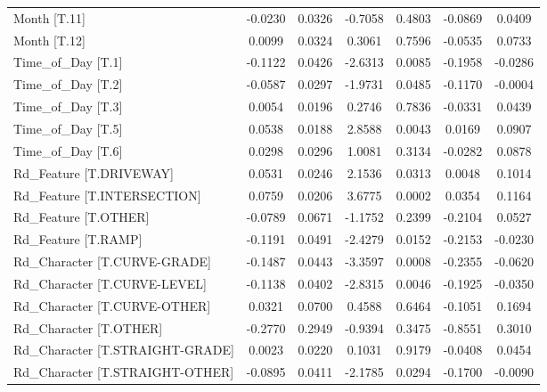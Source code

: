 \begin{longtable}{p{4cm}cccccc}
Month [T.11]                                  & -0.0230 &    0.0326 & -0.7058 &       0.4803 & -0.0869 &  0.0409 \\
Month [T.12]                                  &  0.0099 &    0.0324 &  0.3061 &       0.7596 & -0.0535 &  0.0733 \\
Time\_of\_Day [T.1]                             & -0.1122 &    0.0426 & -2.6313 &       0.0085 & -0.1958 & -0.0286 \\
Time\_of\_Day [T.2]                             & -0.0587 &    0.0297 & -1.9731 &       0.0485 & -0.1170 & -0.0004 \\
Time\_of\_Day [T.3]                             &  0.0054 &    0.0196 &  0.2746 &       0.7836 & -0.0331 &  0.0439 \\
Time\_of\_Day [T.5]                             &  0.0538 &    0.0188 &  2.8588 &       0.0043 &  0.0169 &  0.0907 \\
Time\_of\_Day [T.6]                             &  0.0298 &    0.0296 &  1.0081 &       0.3134 & -0.0282 &  0.0878 \\
Rd\_Feature [T.DRIVEWAY]                       &  0.0531 &    0.0246 &  2.1536 &       0.0313 &  0.0048 &  0.1014 \\
Rd\_Feature [T.INTERSECTION]                   &  0.0759 &    0.0206 &  3.6775 &       0.0002 &  0.0354 &  0.1164 \\
Rd\_Feature [T.OTHER]                          & -0.0789 &    0.0671 & -1.1752 &       0.2399 & -0.2104 &  0.0527 \\
Rd\_Feature [T.RAMP]                           & -0.1191 &    0.0491 & -2.4279 &       0.0152 & -0.2153 & -0.0230 \\
Rd\_Character [T.CURVE-GRADE]                  & -0.1487 &    0.0443 & -3.3597 &       0.0008 & -0.2355 & -0.0620 \\
Rd\_Character [T.CURVE-LEVEL]                  & -0.1138 &    0.0402 & -2.8315 &       0.0046 & -0.1925 & -0.0350 \\
Rd\_Character [T.CURVE-OTHER]                  &  0.0321 &    0.0700 &  0.4588 &       0.6464 & -0.1051 &  0.1694 \\
Rd\_Character [T.OTHER]                        & -0.2770 &    0.2949 & -0.9394 &       0.3475 & -0.8551 &  0.3010 \\
Rd\_Character [T.STRAIGHT-GRADE]               &  0.0023 &    0.0220 &  0.1031 &       0.9179 & -0.0408 &  0.0454 \\
Rd\_Character [T.STRAIGHT-OTHER]               & -0.0895 &    0.0411 & -2.1785 &       0.0294 & -0.1700 & -0.0090 \\

\end{longtable}
